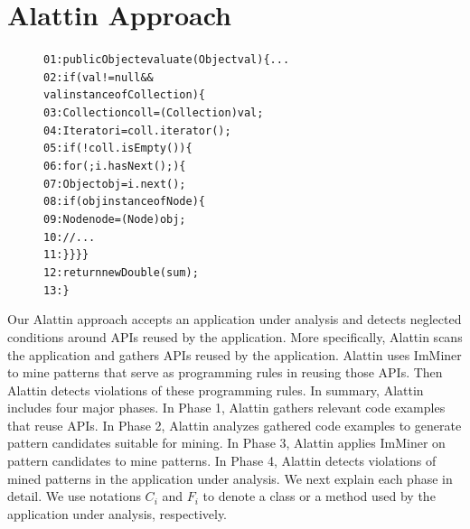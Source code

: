 \section{Alattin Approach}
\label{sec:framework}

\begin{figure}[t]
\begin{CodeOut}
\begin{alltt}
01:public Object evaluate(Object val) \{ ...
02:\hspace*{0.2in}if (val != null && 
\hspace*{1.3in}val instanceof Collection) \{
03:\hspace*{0.4in}Collection coll = (Collection) val;
04:\hspace*{0.4in}Iterator i = coll.iterator(); 
05:\hspace*{0.4in}if(!coll.isEmpty()) \{
06:\hspace*{0.6in}for (; i.hasNext();) \{
07:\hspace*{0.8in}Object obj = i.next(); 
08:\hspace*{0.8in}if(obj instanceof Node) \{
09:\hspace*{1.0in}Node node = (Node) obj;
10:\hspace*{1.0in}//...
11:\hspace*{0.8in}\} \} \} \}
12:\hspace*{0.2in}return new Double(sum);
13:\}
\end{alltt}
\end{CodeOut}\vspace{-1ex}
\vspace{-4ex}
\end{figure}

Our Alattin approach accepts an application under analysis and detects neglected conditions around APIs reused by the application. More specifically, Alattin scans the application and gathers APIs reused by the application. Alattin uses ImMiner to mine patterns that serve as programming rules in reusing those APIs. Then Alattin detects violations of these programming rules. In summary, Alattin includes four major phases. In Phase 1, Alattin gathers relevant code
examples that reuse APIs. In Phase 2, Alattin analyzes gathered code examples to generate pattern candidates suitable for mining. In Phase 3, Alattin applies ImMiner on pattern candidates to mine patterns. In Phase 4, Alattin detects violations of mined patterns in the application under analysis. We next explain each phase in detail. We use notations $C_i$ and $F_i$ to denote a class or a method used by the application under analysis, respectively.

